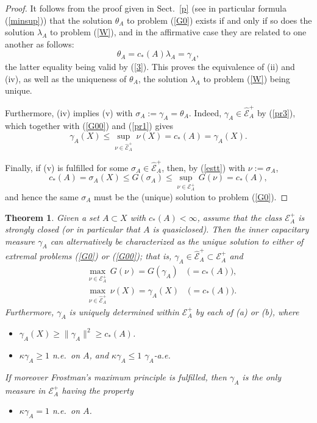 \documentclass[12pt,a4paper,reqno]{amsart} %
\theoremstyle{lause}
\theoremstyle{maaritelma}
\theoremstyle{lause}
\newtheorem{theorem}{Theorem}[section]
\theoremstyle{maaritelma}
\numberwithin{equation}{section}
\begin{document}
\begin{proof}
It follows from the proof given in Sect.~\ref{p} (see in particular formula (\ref{minsup})) that the solution $\theta_A$ to problem (\ref{G0}) exists if and only if so does
the solution $\lambda_A$ to problem (\ref{W}), and in the affirmative case they are related to one another as follows:
\[\theta_A=c_*(A)\lambda_A=\gamma_A,\]
the latter equality being valid by (\ref{3}). This proves the equivalence of (ii) and (iv), as well as the uniqueness of $\theta_A$, the solution $\lambda_A$ to problem (\ref{W}) being unique.

Furthermore, (iv) implies (v) with $\sigma_A:=\gamma_A=\theta_A$. Indeed,
$\gamma_A\in\widehat{\mathcal E}^+_A$ by (\ref{pr3}), which together with (\ref{G00}) and (\ref{pr1}) gives
\[\gamma_A(X)\leqslant\sup_{\nu\in\widehat{\mathcal E}^+_A}\,\nu(X)=c_*(A)=\gamma_A(X).\]

Finally, if (v) is fulfilled for some $\sigma_A\in\widehat{\mathcal E}^+_A$, then, by (\ref{estt}) with $\nu:=\sigma_A$,
\[c_*(A)=\sigma_A(X)\leqslant G(\sigma_A)\leqslant\sup_{\nu\in\mathcal E^+_A}\,G(\nu)=c_*(A),\]
and hence the same $\sigma_A$ must be the (unique) solution to problem (\ref{G0}).
\end{proof}

\begin{theorem}\label{cor3} Given a set\/ $A\subset X$ with\/ $c_*(A)<\infty$, assume that the class\/ $\mathcal E^+_A$ is strongly closed\/ {\rm(}or in particular that\/ $A$ is quasiclosed\/{\rm)}. Then
the inner capacitary measure\/ $\gamma_A$ can alternatively be characterized as the unique solution to either of extremal problems\/ {\rm(\ref{G0})} or\/ {\rm(\ref{G00})}; that is, $\gamma_A\in\widehat{\mathcal E}^+_A\subset\mathcal E^+_A$ and
  \begin{align}
    &\max_{\nu\in\mathcal E^+_A}\,G(\nu)=G(\gamma_A)\quad\bigl({}=c_*(A)\bigr),\label{cl1}\\
    &\max_{\nu\in\widehat{\mathcal E}^+_A}\,\nu(X)=\gamma_A(X)\quad\bigl({}=c_*(A)\bigr).\label{cl2}
  \end{align}
Furthermore, $\gamma_A$ is uniquely determined within\/ $\mathcal E^+_A$ by each of\/ {\rm(a)} or\/ {\rm(b)}, where
\begin{itemize}
\item[{\rm(a)}] $\gamma_A(X)\geqslant\|\gamma_A\|^2\geqslant c_*(A)$.
\item[{\rm(b)}] $\kappa\gamma_A\geqslant1$ n.e.\ on $A$, and\/ $\kappa\gamma_A\leqslant1$ $\gamma_A$-a.e.
\end{itemize}
If moreover Frostman's maximum principle is fulfilled, then\/ $\gamma_A$ is the only measure in\/ $\mathcal E^+_A$ having the property
\begin{itemize}
\item[{\rm(c)}] $\kappa\gamma_A=1$ n.e.\ on\/ $A$.
\end{itemize}
\end{theorem}
\end{document}
